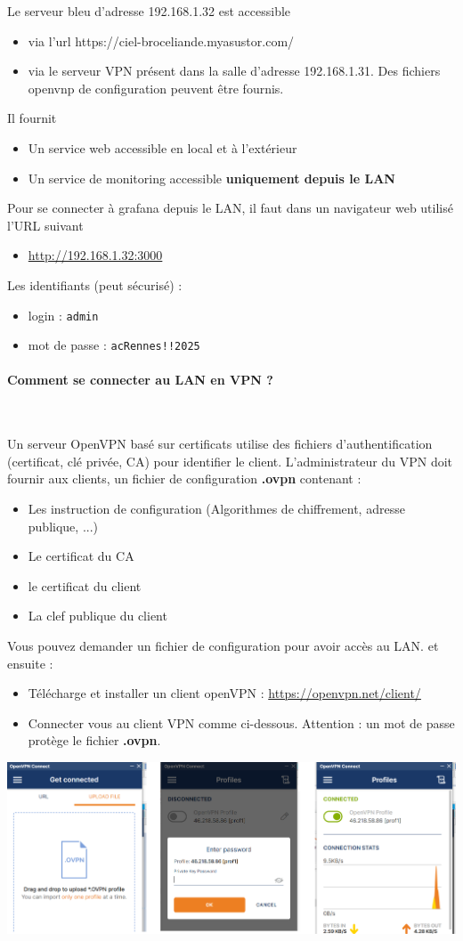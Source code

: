 \documentclass[french, 12pt]{article}%
\newcommand{\itemE}{\item[$\bullet$]}
\begin{document}
Le serveur bleu d'adresse 192.168.1.32 est accessible 
\begin{itemize}
\itemE via l'url https://ciel-broceliande.myasustor.com/
\itemE via le serveur VPN présent dans la salle d'adresse 192.168.1.31. Des fichiers openvnp de configuration peuvent être fournis.
\end{itemize}
Il fournit 
\begin{itemize}	
\itemE Un service web accessible en local et à l'extérieur 
\itemE Un service de monitoring accessible \textbf{uniquement depuis le LAN}
\end{itemize}

\vspace{0.5cm}
Pour se connecter à grafana depuis le LAN, il faut dans un navigateur web utilisé l'URL suivant  
\begin{itemize}
\itemE \url{http://192.168.1.32:3000}
\end{itemize}


\vspace{0.5cm}
Les identifiants (peut sécurisé) : 
\begin{itemize}
\itemE login : \verb?admin?
\itemE mot de passe : \verb?acRennes!!2025?
\end{itemize}

\paragraph{Comment se connecter au LAN en VPN ?} \

Un serveur OpenVPN basé sur certificats utilise des fichiers d'authentification (certificat, clé privée, CA) pour identifier le client. L'administrateur du VPN doit fournir aux clients, un fichier de configuration \textbf{.ovpn} contenant : 
\begin{itemize}
\itemE Les instruction de configuration (Algorithmes de chiffrement, adresse publique, ...)
\itemE Le certificat du CA
\itemE le certificat du client
\itemE La clef publique du client 
\end{itemize}
Vous pouvez demander un fichier de configuration pour avoir accès au LAN. et ensuite : 

\vspace{0.5cm}
 
\begin{itemize}
\itemE  Télécharge et installer un client openVPN : \url{https://openvpn.net/client/}
\itemE  Connecter vous au client VPN comme ci-dessous. Attention : un mot de passe protège le fichier \textbf{.ovpn}.
\end{itemize}
\begin{center}
\includegraphics[scale=0.4]{./ressource/vpnImageWindows.png}
\end{center}
\end{document}
